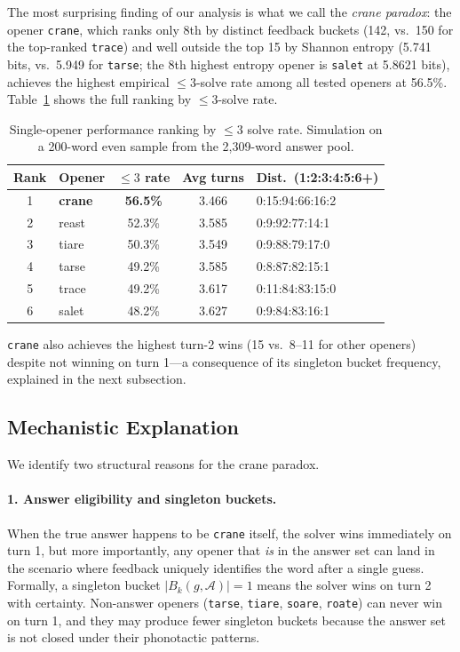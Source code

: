 \documentclass{article}
\begin{document}
The most surprising finding of our analysis is what we call the \emph{crane
paradox}: the opener \texttt{crane}, which ranks only 8th by distinct feedback
buckets (142, vs.\ 150 for the top-ranked \texttt{trace}) and well outside the
top 15 by Shannon entropy (5.741 bits, vs.\ 5.949 for \texttt{tarse}; the 8th
highest entropy opener is \texttt{salet} at 5.8621 bits), achieves the highest
empirical $\leq 3$-solve rate among all tested openers at 56.5\%. Table~\ref{tab:crane}
shows the full ranking by $\leq 3$-solve rate.

\begin{table}[h]
  \centering
  \caption{Single-opener performance ranking by $\leq 3$ solve rate.
    Simulation on a 200-word even sample from the 2,309-word answer pool.}
  \label{tab:crane}
  \begin{tabular}{clccl}
    \toprule
    Rank & Opener & $\leq 3$ rate & Avg turns & Dist.\ (1:2:3:4:5:6+) \\
    \midrule
    1 & \textbf{crane} & \textbf{56.5\%} & 3.466 & 0:15:94:66:16:2 \\
    2 & reast          & 52.3\%          & 3.585 & 0:9:92:77:14:1 \\
    3 & tiare          & 50.3\%          & 3.549 & 0:9:88:79:17:0 \\
    4 & tarse          & 49.2\%          & 3.585 & 0:8:87:82:15:1 \\
    5 & trace          & 49.2\%          & 3.617 & 0:11:84:83:15:0 \\
    6 & salet          & 48.2\%          & 3.627 & 0:9:84:83:16:1 \\
    \bottomrule
  \end{tabular}
\end{table}

\texttt{crane} also achieves the highest turn-2 wins (15 vs.\ 8--11
for other openers) despite not winning on turn 1---a consequence of its singleton
bucket frequency, explained in the next subsection.

\subsection{Mechanistic Explanation}

We identify two structural reasons for the crane paradox.

\paragraph{1. Answer eligibility and singleton buckets.}
When the true answer happens to be \texttt{crane} itself, the solver wins
immediately on turn 1, but more importantly, any opener that \emph{is} in the
answer set can land in the scenario where feedback uniquely identifies the word
after a single guess. Formally, a singleton bucket $|B_k(g, \mathcal{A})| = 1$
means the solver wins on turn 2 with certainty. Non-answer openers (\texttt{tarse},
\texttt{tiare}, \texttt{soare}, \texttt{roate}) can never win on turn 1, and
they may produce fewer singleton buckets because the answer set is not closed
under their phonotactic patterns.
\end{document}
